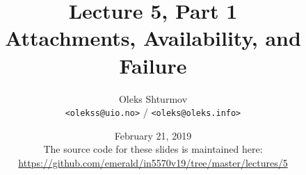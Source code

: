 \documentclass[xcolor=table]{beamer}
\title{{\large Lecture 5, Part 1\\ Attachments, Availability, and Failure}}
\institute{University of Oslo}
\author{Oleks Shturmov\\[-0.2em]%
  {\tiny \texttt{<olekss@uio.no>} / \texttt{<oleks@oleks.info>}}
}
\date{February 21, 2019\\[2em]
{\scriptsize The source code for these slides is maintained here: \\[-0.5em] {\tiny%
\url{https://github.com/emerald/in5570v19/tree/master/lectures/5}}%
}}
\begin{document}
\begin{frame} \titlepage \end{frame}








\end{document}
